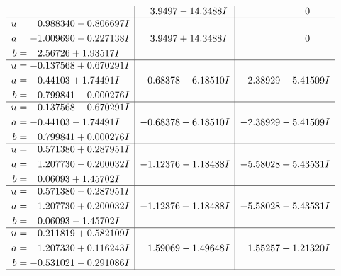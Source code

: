 \documentclass[1p]{elsarticle_modified}
\theoremstyle{definition}
\begin{document}
$$\begin{array}{c|c|c}
 & \phantom{-}3.9497 - 14.3488 I & \phantom{-0.000000 } 0 \\ \hline\begin{aligned}
u &= \phantom{-}0.988340 - 0.806697 I \\
a &= -1.009690 - 0.227138 I \\
b &= \phantom{-}2.56726 + 1.93517 I\end{aligned}
 & \phantom{-}3.9497 + 14.3488 I & \phantom{-0.000000 } 0 \\ \hline\begin{aligned}
u &= -0.137568 + 0.670291 I \\
a &= -0.44103 + 1.74491 I \\
b &= \phantom{-}0.799841 - 0.000276 I\end{aligned}
 & -0.68378 - 6.18510 I & -2.38929 + 5.41509 I \\ \hline\begin{aligned}
u &= -0.137568 - 0.670291 I \\
a &= -0.44103 - 1.74491 I \\
b &= \phantom{-}0.799841 + 0.000276 I\end{aligned}
 & -0.68378 + 6.18510 I & -2.38929 - 5.41509 I \\ \hline\begin{aligned}
u &= \phantom{-}0.571380 + 0.287951 I \\
a &= \phantom{-}1.207730 - 0.200032 I \\
b &= \phantom{-}0.06093 + 1.45702 I\end{aligned}
 & -1.12376 - 1.18488 I & -5.58028 + 5.43531 I \\ \hline\begin{aligned}
u &= \phantom{-}0.571380 - 0.287951 I \\
a &= \phantom{-}1.207730 + 0.200032 I \\
b &= \phantom{-}0.06093 - 1.45702 I\end{aligned}
 & -1.12376 + 1.18488 I & -5.58028 - 5.43531 I \\ \hline\begin{aligned}
u &= -0.211819 + 0.582109 I \\
a &= \phantom{-}1.207330 + 0.116243 I \\
b &= -0.531021 - 0.291086 I\end{aligned}
 & \phantom{-}1.59069 - 1.49648 I & \phantom{-}1.55257 + 1.21320 I\\
 \hline 
 \end{array}$$\newpage$$\begin{array}{c|c|c}  

\end{array}$$
\end{document}
